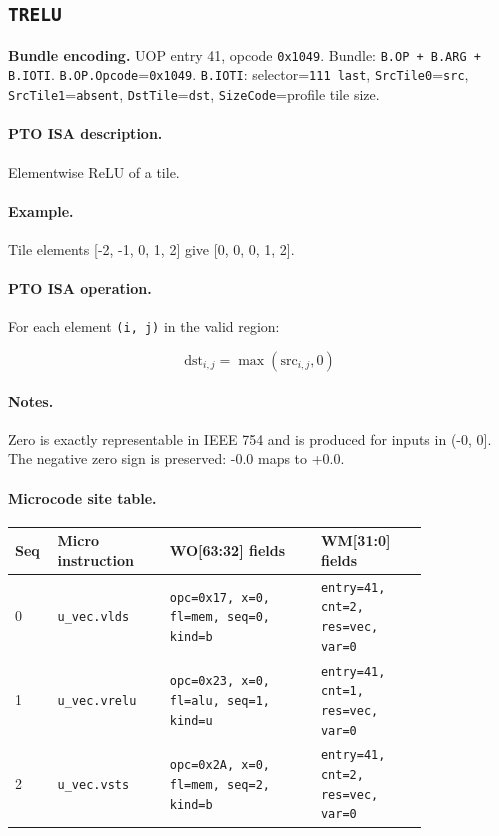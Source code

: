 \subsection{\texttt{TRELU}}
\noindent\textbf{Bundle encoding.} UOP entry 41, opcode \texttt{0x1049}. Bundle: \texttt{B.OP + B.ARG + B.IOTI}. \texttt{B.OP.Opcode}=\texttt{0x1049}. \texttt{B.IOTI}: selector=\texttt{111 last}, \texttt{SrcTile0}=\texttt{src}, \texttt{SrcTile1}=\texttt{absent}, \texttt{DstTile}=\texttt{dst}, \texttt{SizeCode}=profile tile size.\par\smallskip
{\small
\paragraph{PTO ISA description.}
Elementwise ReLU of a tile.
\paragraph{Example.}
Tile elements [-2, -1, 0, 1, 2] give [0, 0, 0, 1, 2].
\par\smallskip
\paragraph{PTO ISA operation.}
For each element \texttt{(i, j)} in the valid region:

\[
\mathrm{dst}_{i,j} = \max(\mathrm{src}_{i,j}, 0)
\]
}\par\smallskip
\paragraph{Notes.}
Zero is exactly representable in IEEE 754 and is produced for inputs in (-0, 0]. The negative zero sign is preserved: -0.0 maps to +0.0.
\paragraph{Microcode site table.}
{\scriptsize
\begin{longtable}{@{}R{0.055\linewidth}L{0.23\linewidth}L{0.31\linewidth}L{0.22\linewidth}@{}}
\toprule
Seq & Micro instruction & WO[63:32] fields & WM[31:0] fields \\
 & \texttt{u\_vec.vlds} & \texttt{opc=0x17, x=0, fl=mem, seq=0, kind=b} & \texttt{entry=41, cnt=2, res=vec, var=0} \\
1 & \texttt{u\_vec.vrelu} & \texttt{opc=0x23, x=0, fl=alu, seq=1, kind=u} & \texttt{entry=41, cnt=1, res=vec, var=0} \\
2 & \texttt{u\_vec.vsts} & \texttt{opc=0x2A, x=0, fl=mem, seq=2, kind=b} & \texttt{entry=41, cnt=2, res=vec, var=0} \\
\bottomrule
\end{longtable}
}
